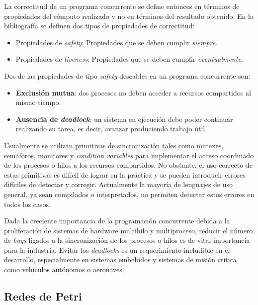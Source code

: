 \documentclass[12pt]{article}
\begin{document}
La correctitud de un programa concurrente se define entonces en términos de propiedades del cómputo realizado y no en términos del
resultado obtenido. En la bibliografía \cite{ben-ari2006, coulouris2012, tanenbaum2017} se definen dos tipos de propiedades de correctitud:

\begin{itemize}
    \item Propiedades de \textit{safety}: Propiedades que se deben cumplir \textit{siempre}.
    \item Propiedades de \textit{liveness}: Propiedades que se deben cumplir \textit{eventualmente}.
\end{itemize}

Dos de las propiedades de tipo \textit{safety} deseables en un programa concurrente son:

\begin{itemize}
    \item \textbf{Exclusión mutua}: dos procesos no deben acceder a recursos compartidos al mismo tiempo.
    \item \textbf{Ausencia de \textit{deadlock}}: un sistema en ejecución debe poder continuar realizando su tarea, es decir, avanzar produciendo trabajo útil.
\end{itemize}

Usualmente se utilizan primitivas de sincronización tales como mutexes, semáforos, monitores y \textit{condition variables}
para implementar el acceso coordinado de los procesos o hilos a los recursos compartidos.
No obstante, el uso correcto de estas primitivas es difícil de lograr en la práctica y se pueden introducir errores difíciles de detectar y corregir.
Actualmente la mayoría de lenguajes de uso general, ya sean compilados o interpretados, no permiten detectar estos errores en todos los casos.

Dada la creciente importancia de la programación concurrente debida a la proliferación de sistemas de hardware multihilo y multiproceso,
reducir el número de \textit{bugs} ligados a la sincronización de los procesos o hilos es de vital importancia para la industria.
Evitar los \textit{deadlocks} es un requerimiento ineludible en el desarrollo, especialmente en sistemas embebidos y sistemas de misión crítica como vehículos autónomos o aeronaves.

\subsection{Redes de Petri}
\end{document}
